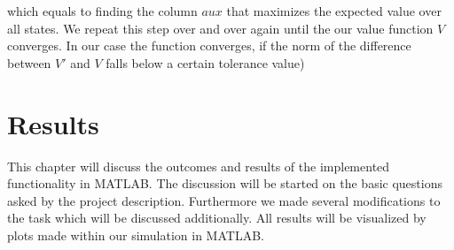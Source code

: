 \documentclass[12pt, a4paper, oneside]{article}
\begin{document}
which equals to finding the column $aux$ that maximizes the expected value over all states.
We repeat this step over and over again until the our value function $V$ converges.
In our case the function converges, if the norm of the difference between $V'$ and $V$ falls below a certain tolerance value) \\


\newpage
\section{Results}
This chapter will discuss the outcomes and results of the implemented functionality in MATLAB.
The discussion will be started on the basic questions asked by the project description.
Furthermore we made several modifications to the task which will be discussed additionally.
All results will be visualized by plots made within our simulation in MATLAB.
\end{document}
